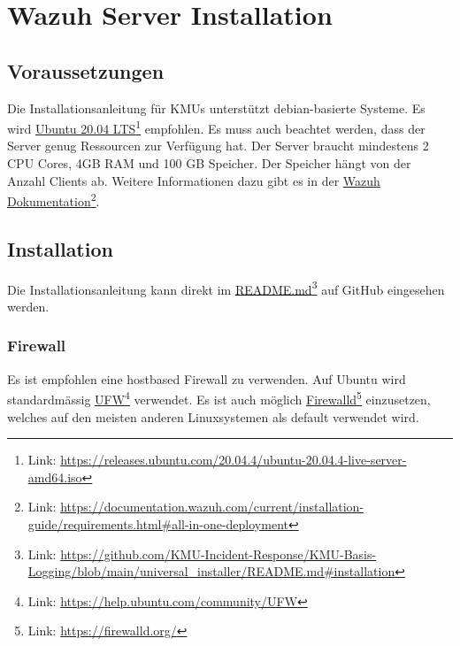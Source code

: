 \chapter{Wazuh Server Installation}

\section{Voraussetzungen}
Die Installationsanleitung für KMUs unterstützt debian-basierte Systeme.
Es wird \href{https://releases.ubuntu.com/20.04.4/ubuntu-20.04.4-live-server-amd64.iso}{Ubuntu 20.04 LTS}\footnote{Link: \href{https://releases.ubuntu.com/20.04.4/ubuntu-20.04.4-live-server-amd64.iso}{https://releases.ubuntu.com/20.04.4/ubuntu-20.04.4-live-server-amd64.iso}} empfohlen.
Es muss auch beachtet werden, dass der Server genug Ressourcen zur Verfügung hat.
Der Server braucht mindestens 2 CPU Cores, 4GB RAM und 100 GB Speicher.
Der Speicher hängt von der Anzahl Clients ab.
Weitere Informationen dazu gibt es in der \href{https://documentation.wazuh.com/current/installation-guide/requirements.html\#all-in-one-deployment}{Wazuh Dokumentation}\footnote{Link: \href{https://documentation.wazuh.com/current/installation-guide/requirements.html\#all-in-one-deployment}{https://documentation.wazuh.com/current/installation-guide/requirements.html\#all-in-one-deployment}}.

\section{Installation}
Die Installationsanleitung kann direkt im \href{https://github.com/KMU-Incident-Response/KMU-Basis-Logging/blob/main/universal\_installer/README.md\#installation}{README.md}\footnote{Link: \href{https://github.com/KMU-Incident-Response/KMU-Basis-Logging/blob/main/universal\_installer/README.md\#installation}{https://github.com/KMU-Incident-Response/KMU-Basis-Logging/blob/main/universal\_installer/README.md\#installation}} auf GitHub eingesehen werden.


\subsection{Firewall}
Es ist empfohlen eine hostbased Firewall zu verwenden.
Auf Ubuntu wird standardmässig \href{https://help.ubuntu.com/community/UFW}{UFW}\footnote{Link: \href{https://help.ubuntu.com/community/UFW}{https://help.ubuntu.com/community/UFW}} verwendet.
Es ist auch möglich \href{https://firewalld.org/}{Firewalld}\footnote{Link: \href{https://firewalld.org/}{https://firewalld.org/}} einzusetzen, welches auf den meisten anderen Linuxsystemen als default verwendet wird.

